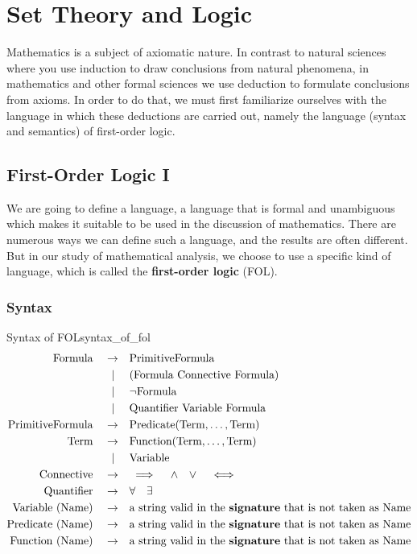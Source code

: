 \documentclass[../main.tex]{subfiles}
\begin{document}
\setcounter{chapter}{1}
\chapter{Set Theory and Logic}\label{cha:set_theory_and_logic}
Mathematics is a subject of axiomatic nature. In contrast to natural sciences where you use induction to draw conclusions from natural phenomena, in mathematics and other formal sciences we use deduction to formulate conclusions from axioms. In order to do that, we must first familiarize ourselves with the language in which these deductions are carried out, namely the language (syntax and semantics) of first-order logic.

\section{First-Order Logic I}
We are going to define a language, a language that is formal and unambiguous which makes it suitable to be used in the discussion of mathematics. There are numerous ways we can define such a language, and the results are often different. But in our study of mathematical analysis, we choose to use a specific kind of language, which is called the \textbf{first-order logic} (FOL).

\subsection{Syntax}
\begin{definition}{Syntax of FOL}{syntax_of_fol}
\begin{align*}
\text{Formula}\quad\to\quad&\text{PrimitiveFormula}\\
|\,\,\quad&(\text{Formula Connective Formula})\\
|\,\,\quad&\neg\text{Formula}\\
|\,\,\quad&\text{Quantifier Variable Formula}\\
\text{PrimitiveFormula}\quad\to\quad&\text{Predicate}(\text{Term},\dots,\text{Term})\\
\text{Term}\quad\to\quad&\text{Function}(\text{Term},\dots,\text{Term})\\
|\,\,\quad&\text{Variable}\\
\text{Connective}\quad\to\quad&\implies\quad\land\quad\lor\quad\iff\\
\text{Quantifier}\quad\to\quad&\forall\quad\exists\\
\text{Variable (Name)}\quad\to\quad&\text{a string valid in the \textbf{signature} that is not taken as Name}\\
\text{Predicate (Name)}\quad\to\quad&\text{a string valid in the \textbf{signature} that is not taken as Name}\\
\text{Function (Name)}\quad\to\quad&\text{a string valid in the \textbf{signature} that is not taken as Name}\\
\end{align*}
\end{definition}
\end{document}
